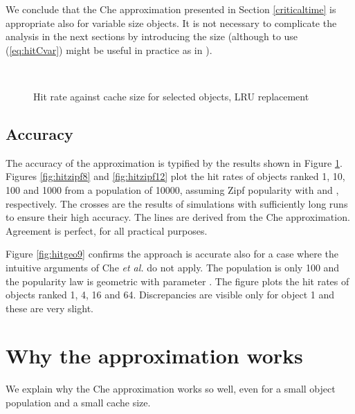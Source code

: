 \documentclass{amsart}
\def\etal{{\em et al. }}
\begin{document}
We conclude that the Che approximation presented in Section \ref{criticaltime} is appropriate also for variable size objects. It is not necessary to complicate the analysis in the next sections by introducing the size  (although to use (\ref{eq:hitCvar}) might be useful in practice as in \cite{FRRS12}). 

 
\begin{figure}
  \centering
\  \vspace{-3mm}\hspace{-2cm}
 \\
   \caption{Hit rate against cache size for selected objects, LRU replacement}
  \label{fig:approx}
  \vspace{-3mm}
\end{figure}

\subsection{Accuracy}
The accuracy of the approximation is typified by the results shown in Figure \ref{fig:approx}.  Figures \ref{fig:hitzipf8} and \ref{fig:hitzipf12} plot the hit rates of objects ranked 1, 10, 100 and 1000 from a population of 10000, assuming Zipf popularity with  and , respectively.  The crosses are the results of simulations with sufficiently long runs to ensure their high accuracy. The lines are derived from the Che approximation. Agreement is perfect, for all practical purposes.  

Figure \ref{fig:hitgeo9} confirms the approach is accurate also for a case where the intuitive arguments of Che \etal  do not apply. The population is only 100 and the popularity law is geometric with parameter . The figure plots the hit rates of objects ranked 1, 4, 16 and 64. Discrepancies are visible only for object 1 and these are very slight.

    



\section{Why the approximation works}
\label{sec:whyitworks}
We explain why the Che approximation works so well, even for a small object population and a small cache size.
\end{document}

